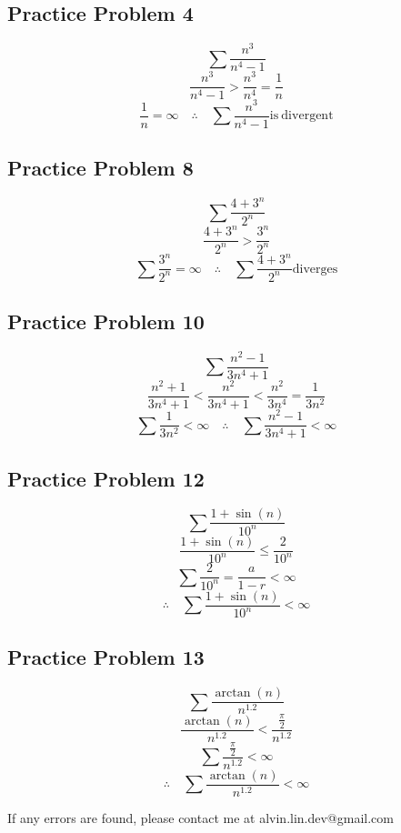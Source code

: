 \documentclass[letterpaper, 12pt]{math}
\begin{document}
\subsection*{Practice Problem 4}
\[ \sum\frac{n^{3}}{n^{4}-1} \]
\[ \frac{n^{3}}{n^{4}-1} > \frac{n^{3}}{n^{4}} = \frac{1}{n} \]
\[ \frac{1}{n} = \infty \quad \therefore \quad \sum\frac{n^{3}}{n^{4}-1}
   \mathrm{is\ divergent} \]

\subsection*{Practice Problem 8}
\[ \sum\frac{4+3^{n}}{2^{n}} \]
\[ \frac{4+3^{n}}{2^{n}} > \frac{3^{n}}{2^{n}} \]
\[ \sum\frac{3^{n}}{2^{n}} = \infty \quad \therefore \quad
   \sum\frac{4+3^{n}}{2^{n}} \mathrm{diverges} \]

\subsection*{Practice Problem 10}
\[ \sum\frac{n^{2}-1}{3n^{4}+1} \]
\[ \frac{n^{2}+1}{3n^{4}+1} < \frac{n^{2}}{3n^{4}+1} < \frac{n^{2}}{3n^{4}} =
   \frac{1}{3n^{2}} \]
\[ \sum\frac{1}{3n^{2}} < \infty \quad \therefore \quad
   \sum\frac{n^{2}-1}{3n^{4}+1} < \infty \]

\subsection*{Practice Problem 12}
\[ \sum\frac{1+\sin(n)}{10^{n}} \]
\[ \frac{1+\sin(n)}{10^{n}} \leq \frac{2}{10^{n}} \]
\[ \sum\frac{2}{10^{n}} = \frac{a}{1-r} < \infty \]
\[ \therefore \quad \sum\frac{1+\sin(n)}{10^{n}} < \infty \]

\subsection*{Practice Problem 13}
\[ \sum\frac{\arctan(n)}{n^{1.2}} \]
\[ \frac{\arctan(n)}{n^{1.2}} < \frac{\frac{\pi}{2}}{n^{1.2}} \]
\[ \sum\frac{\frac{\pi}{2}}{n^{1.2}} < \infty \]
\[ \therefore \quad \sum\frac{\arctan(n)}{n^{1.2}} < \infty \]

\begin{center}
  If any errors are found, please contact me at alvin.lin.dev@gmail.com
\end{center}
\end{document}
